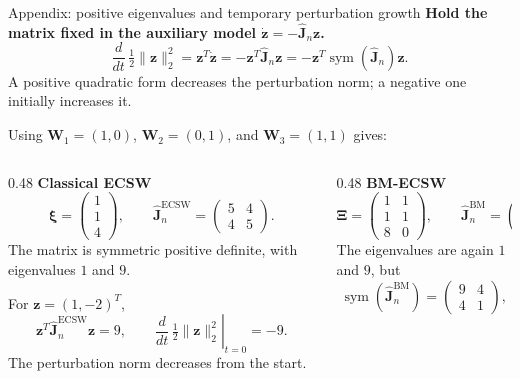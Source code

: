 \documentclass[aspectratio=169]{beamer}
\newcommand{\vect}[1]{\boldsymbol{#1}}
\newcommand{\matr}[1]{\boldsymbol{#1}}
\begin{document}
\begin{frame}{Appendix: positive eigenvalues and temporary perturbation growth}
\hypertarget{bmecsw-positive-eigenvalue-example}{}
\fontsize{9}{10.5}\selectfont
\setlength{\parskip}{0pt}
\setlength{\abovedisplayskip}{2pt}
\setlength{\belowdisplayskip}{2pt}
\setlength{\abovedisplayshortskip}{2pt}
\setlength{\belowdisplayshortskip}{2pt}
\textbf{Hold the matrix fixed in the auxiliary model $\dot{\vect{z}}=-\widehat{\matr{J}}_n\vect{z}$.}
\[
 \frac{d}{dt}\,\tfrac12\|\vect{z}\|_2^2
 =\vect{z}^T\dot{\vect{z}}
 =-\vect{z}^T\widehat{\matr{J}}_n\vect{z}
 =-\vect{z}^T\operatorname{sym}(\widehat{\matr{J}}_n)\vect{z}.
\]
A positive quadratic form decreases the perturbation norm; a negative one initially increases it.\par
Using $\matr{W}_1=(1,0)$, $\matr{W}_2=(0,1)$, and $\matr{W}_3=(1,1)$ gives:
\begin{columns}[T,onlytextwidth]
\begin{column}{0.48\textwidth}
\textbf{Classical ECSW}
\[
 \vect{\xi}=\begin{pmatrix}1\\1\\4\end{pmatrix},
 \qquad \widehat{\matr{J}}_n^{\mathrm{ECSW}}
 =\begin{pmatrix}5&4\\4&5\end{pmatrix}.
\]
The matrix is symmetric positive definite, with eigenvalues $1$ and $9$.\par
For $\vect{z}=(1,-2)^T$,
\[
 \vect{z}^T\widehat{\matr{J}}_n^{\mathrm{ECSW}}\vect{z}=9,
 \qquad \left.\frac{d}{dt}\,\tfrac12\|\vect{z}\|_2^2\right|_{t=0}=-9.
\]
The perturbation norm decreases from the start.
\end{column}
\begin{column}{0.48\textwidth}
\textbf{BM-ECSW}
\[
 \matr{\Xi}=\begin{pmatrix}1&1\\1&1\\8&0\end{pmatrix},
 \qquad \widehat{\matr{J}}_n^{\mathrm{BM}}
 =\begin{pmatrix}9&8\\0&1\end{pmatrix}.
\]
The eigenvalues are again $1$ and $9$, but
\[
 \operatorname{sym}(\widehat{\matr{J}}_n^{\mathrm{BM}})
 =\begin{pmatrix}9&4\\4&1\end{pmatrix},
\]
\end{column}
\end{columns}
\end{frame}
\end{document}
